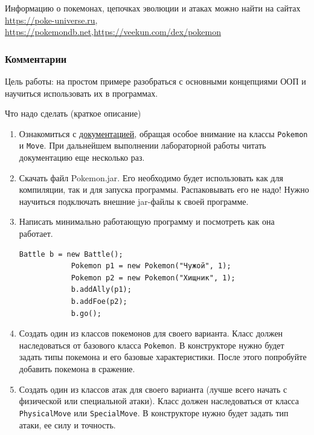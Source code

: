     Информацию о покемонах, цепочках эволюции и атаках можно найти на сайтах \href{https://poke-universe.ru/}{https://poke-universe.ru}, \href{https://pokemondb.net/}{https://pokemondb.net},\href{https://veekun.com/dex/pokemon}{https://veekun.com/dex/pokemon}

    \subsubsection*{Комментарии}
    Цель работы: на простом примере разобраться с основными концепциями ООП и научиться использовать их в программах.

    Что надо сделать (краткое описание)

    \begin{enumerate}
        \setlength{\itemsep}{0pt} %
        \setlength{\parskip}{0pt}
        \setlength{\parsep}{0pt}
        \item Ознакомиться с \href{https://se.ifmo.ru/~tony/doc/}{документацией}, обращая особое внимание на классы \verb|Pokemon| и \verb|Move|.
        При дальнейшем выполнении лабораторной работы читать документацию еще несколько раз.
        \item Скачать файл Pokemon.jar.
        Его необходимо будет использовать как для компиляции, так и для запуска программы.
        Распаковывать его не надо!
        Нужно научиться подключать внешние jar-файлы к своей программе.
        \item Написать минимально работающую программу и посмотреть как она работает.
        \begin{lstlisting}[label={lst:java1}]
            Battle b = new Battle();
            Pokemon p1 = new Pokemon("Чужой", 1);
            Pokemon p2 = new Pokemon("Хищник", 1);
            b.addAlly(p1);
            b.addFoe(p2);
            b.go();
        \end{lstlisting}
        \item Создать один из классов покемонов для своего варианта.
        Класс должен наследоваться от базового класса \verb|Pokemon|.
        В конструкторе нужно будет задать типы покемона и его базовые характеристики.
        После этого попробуйте добавить покемона в сражение.
        \item Создать один из классов атак для своего варианта (лучше всего начать с физической или специальной атаки).
        Класс должен наследоваться от класса \verb|PhysicalMove| или \verb|SpecialMove|.
        В конструкторе нужно будет задать тип атаки, ее силу и точность.

\end{enumerate}
